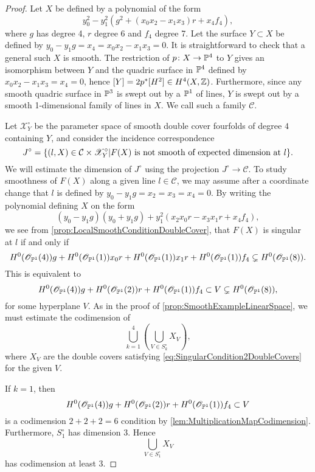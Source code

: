 \begin{proof}
  Let $X$ be defined by a polynomial of the form
  \begin{equation}
  	\label{eq:QuadricSurfaceForm}
  	y_0^2 - y_1^2(g^2 + (x_0x_2 - x_1x_3)r + x_4 f_4),
  \end{equation}
where $g$ has degree 4, $r$ degree 6 and $f_4$ degree 7. Let the surface $Y \subset X$ be defined by $y_0-y_1g = x_4 = x_0x_2 - x_1x_3 = 0$. It is straightforward to check that a general such $X$ is smooth. The restriction of $p \from X \to \P^4$ to $Y$ gives an isomorphism between $Y$ and the quadric surface in $\P^4$ defined by $x_0x_2 - x_1x_3=x_4 = 0$, hence $[Y] = 2p^*[H^2] \in H^4(X,\Z)$. Furthermore, since any smooth quadric surface in $\P^3$ is swept out by a $\P^1$ of  lines, $Y$ is swept out by a smooth 1-dimensional family of lines in $X$. We call such a family $\mathcal{C}$.

Let $\mathscr{X}_Y^\circ$ be the parameter space of smooth double cover fourfolds of degree $4$ containing $Y$, and consider the incidence correspondence
\[J^\circ = \set{(l,X) \in \mathcal{C} \times \mathscr{X}_Y^\circ \vert F(X) \text{ is not smooth of expected dimension at } l}.\]
We will estimate the dimension of $J^\circ$ using the projection $J^\circ \to \mathcal{C}$. To study smoothness of $F(X)$ along a given line $l \in \mathcal{C}$, we may assume after a coordinate change that $l$ is defined by $y_0-y_1g = x_2 = x_3 = x_4 = 0$. By writing the polynomial defining $X$ on the form
\[(y_0- y_1g)(y_0 + y_1g) + y_1^2(x_2x_0r - x_3x_1r +  x_4 f_4),\]
we see from \cref{prop:LocalSmoothConditionDoubleCover}, that $F(X)$ is singular at $l$ if and only if
\[H^0(\sO_{\P^1}(4))g + H^0(\sO_{\P^1}(1))x_0r + H^0(\sO_{\P^1}(1))x_1r + H^0(\sO_{\P^1}(1))f_4 \subsetneq H^0(\sO_{\P^1}(8)). \]
This is equivalent to
\begin{equation}
  \label{eq:SingularCondition2DoubleCovers}
  H^0(\sO_{\P^1}(4))g + H^0(\sO_{\P^1}(2))r + H^0(\sO_{\P^1}(1))f_4 \subset V \subsetneq H^0(\sO_{\P^1}(8)), 
\end{equation}
for some hyperplane $V$. As in the proof of \cref{prop:SmoothExampleLinearSpace}, we must estimate the codimension of 
\begin{equation}
  \label{eq:BigUnion2}
  \bigcup_{k=1}^4 \left( \bigcup_{V \in S_k^\circ} X_V \right) ,
\end{equation}
where $X_V$ are the double covers satisfying \eqref{eq:SingularCondition2DoubleCovers} for the given $V$.

If $k=1$, then
\[H^0(\sO_{\P^1}(4))g + H^0(\sO_{\P^1}(2))r + H^0(\sO_{\P^1}(1))f_4 \subset V\]
is a codimension $2+2+2 = 6$ condition  by \cref{lem:MultiplicationMapCodimension}. Furthermore, $S_1^\circ$ has dimension 3. Hence 
\[\bigcup_{V \in S_1^\circ} X_V\]
has codimension at least 3.


\end{proof}
